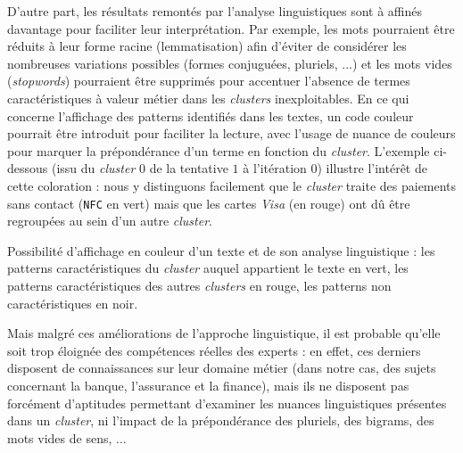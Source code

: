 			D'autre part, les résultats remontés par l'analyse linguistiques sont à affinés davantage pour faciliter leur interprétation.
			Par exemple, les mots pourraient être réduits à leur forme racine (lemmatisation) afin d'éviter de considérer les nombreuses variations possibles (formes conjuguées, pluriels, ...) et les mots vides (\textit{stopwords}) pourraient être supprimés pour accentuer l'absence de termes caractéristiques à valeur métier dans les \textit{clusters} inexploitables.
			En ce qui concerne l'affichage des patterns identifiés dans les textes, un code couleur pourrait être introduit pour faciliter la lecture, avec l'usage de nuance de couleurs pour marquer la prépondérance d'un terme en fonction du \textit{cluster}.
			L'exemple ci-dessous (issu du \textit{cluster} $0$ de la tentative $1$ à l'itération $0$) illustre l'intérêt de cette coloration : nous y distinguons facilement que le \textit{cluster} traite des paiements sans contact (\texttt{NFC} en vert) mais que les cartes \textit{Visa} (en rouge) ont dû être regroupées au sein d'un autre \textit{cluster}.

			\begin{leftBarExamples}
				Possibilité d'affichage en couleur d'un texte et de son analyse linguistique : les patterns caractéristiques du \textit{cluster} auquel appartient le texte en vert, les patterns caractéristiques des autres \textit{clusters} en rouge, les patterns non caractéristiques en noir.
				\begin{quote}
				\end{quote}
			\end{leftBarExamples}
			
			Mais malgré ces améliorations de l'approche linguistique, il est probable qu'elle soit trop éloignée des compétences réelles des experts : en effet, ces derniers disposent de connaissances sur leur domaine métier (dans notre cas, des sujets concernant la banque, l’assurance et la finance), mais ils ne disposent pas forcément d'aptitudes permettant d'examiner les nuances linguistiques présentes dans un \textit{cluster}, ni l'impact de la prépondérance des pluriels, des bigrams, des mots vides de sens, ...
		
